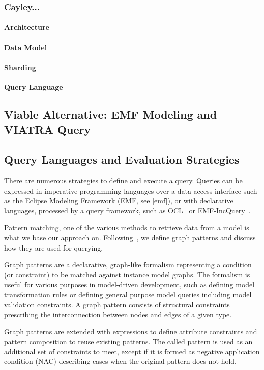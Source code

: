 \subsubsection{Cayley...}
\paragraph{Architecture}
\paragraph{Data Model}
\paragraph{Sharding}
\paragraph{Query Language}

\subsection{Viable Alternative: EMF Modeling and VIATRA Query}

\subsection{Query Languages and Evaluation Strategies}
There are numerous strategies to define and execute a query. Queries can be expressed in imperative programming languages over a data access interface such as the Eclipse Modeling Framework (EMF, see \ref{emf}), or with declarative languages, processed by a query framework, such as OCL~\cite{OCL} or EMF-IncQuery~\cite{IncQuery}.

Pattern matching, one of the various methods to retrieve data from a model is what we base our approach on. Following~\cite{csmr}, we define graph patterns and discuss how they are used for querying.

Graph patterns are a declarative, graph-like formalism representing a
condition (or constraint) to be matched against instance model graphs. The
formalism is useful for various purposes in model-driven development, such as
defining model transformation rules or defining general purpose model queries
including model validation constraints. A graph pattern consists of structural
constraints prescribing the interconnection between nodes and edges of a given
type.

Graph patterns are extended with expressions to define attribute constraints and
pattern composition to reuse existing patterns. The called pattern is used as
an additional set of constraints to meet, except if it is formed as negative
application condition (NAC) describing cases when the original pattern does not hold.

